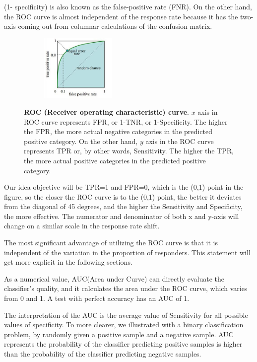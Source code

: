 (1- specificity) is also known as the false-positive rate (FNR). On the other hand, the ROC curve is almost independent of the response rate because it has the two-axis coming out from columnar calculations of the confusion matrix.

\begin{figure}[h]
	\begin{center}
		\begin{subfigure}[b]{\textwidth}
		    \centering
			\includegraphics[width=0.4\textwidth]{thesis-template-master/images/ROC.JPG}
			\label{fig:cellnet}
		\end{subfigure}
	\end{center}
	\caption{\textbf{ROC (Receiver operating characteristic) curve}. $x$ axis in ROC curve represents FPR, or 1-TNR, or 1-Specificity. The higher the FPR, the more actual negative categories in the predicted positive category. On the other hand, $y$ axis in the ROC curve represents TPR or, by other words, Sensitivity. The higher the TPR, the more actual positive categories in the predicted positive category.}
	\label{fig:4.1}
\end{figure}
Our idea objective will be TPR=1 and FPR=0, which is the (0,1) point in the figure, so the closer the ROC curve is to the (0,1) point, the better it deviates from the diagonal of 45 degrees, and the higher the Sensitivity and Specificity, the more effective.
The numerator and denominator of both x and y-axis will change on a similar scale in the response rate shift.

The most significant advantage of utilizing the ROC curve is that it is independent of the variation in the proportion of responders. This statement will get more explicit in the following sections.

As a numerical value, AUC(Area under Curve) can directly evaluate the classifier's quality, and it calculates the area under the ROC curve, which varies from 0 and 1.  A test with perfect accuracy has an AUC of 1.

The interpretation of the AUC is the average value of Sensitivity for all possible values of specificity. To more clearer, we illustrated with a binary classification problem, by randomly given a positive sample and a negative sample. AUC represents the probability of the classifier predicting positive samples is higher than the probability of the classifier predicting negative samples.%


